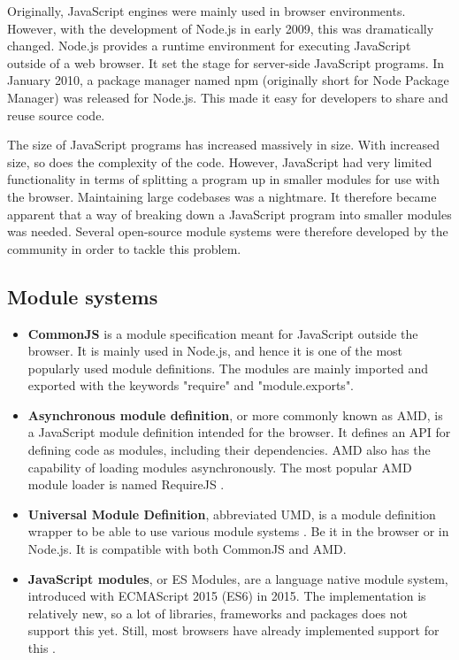 Originally, JavaScript engines were mainly used in browser environments. However, with the development of Node.js in early 2009, this was dramatically changed. Node.js provides a runtime environment for executing JavaScript outside of a web browser. It set the stage for server-side JavaScript programs. In January 2010, a package manager named npm \cite{npm} (originally short for Node Package Manager) was released for Node.js. This made it easy for developers to share and reuse source code.

The size of JavaScript programs has increased massively in size. With increased size, so does the complexity of the code. However, JavaScript had very limited functionality in terms of splitting a program up in smaller modules for use with the browser. Maintaining large codebases was a nightmare. It therefore became apparent that a way of breaking down a JavaScript program into smaller modules was needed. Several open-source module systems were therefore developed by the community in order to tackle this problem.

\subsection{Module systems}
\label{sec:theory-module-system}
\begin{itemize}
    \item \textbf{CommonJS} is a module specification meant for JavaScript outside the browser. It is mainly used in Node.js, and hence it is one of the most popularly used module definitions. The modules are mainly imported and exported with the keywords "require" and "module.exports".
    \item \textbf{Asynchronous module definition}, or more commonly known as AMD, is a JavaScript module definition intended for the browser. It defines an API for defining code as modules, including their dependencies. AMD also has the capability of loading modules asynchronously. The most popular AMD module loader is named RequireJS \cite{requirejs}.
    \item \textbf{Universal Module Definition}, abbreviated UMD, is a module definition wrapper to be able to use various module systems \cite{universal-module-definition}. Be it in the browser or in Node.js. It is compatible with both CommonJS and AMD.
    \item \textbf{JavaScript modules}, or ES Modules, are a language native module system, introduced with ECMAScript 2015 (ES6) in 2015. The implementation is relatively new, so a lot of libraries, frameworks and packages does not support this yet. Still, most browsers have already implemented support for this \cite{es-modules-support}.
\end{itemize}

